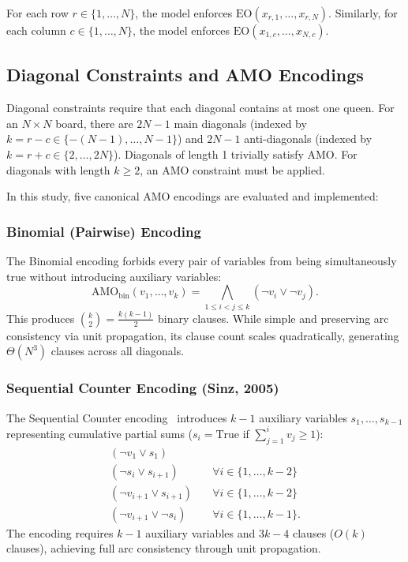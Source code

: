 \documentclass[a4paper,fleqn]{cas-sc}
\begin{document}
For each row $r \in \{1, \dots, N\}$, the model enforces $\text{EO}(x_{r,1}, \dots, x_{r,N})$. Similarly, for each column $c \in \{1, \dots, N\}$, the model enforces $\text{EO}(x_{1,c}, \dots, x_{N,c})$.

\subsection{Diagonal Constraints and AMO Encodings}
\label{sec:amo_methods}

Diagonal constraints require that each diagonal contains at most one queen. For an $N \times N$ board, there are $2N - 1$ main diagonals (indexed by $k = r - c \in \{-(N-1), \dots, N-1\}$) and $2N - 1$ anti-diagonals (indexed by $k = r + c \in \{2, \dots, 2N\}$). Diagonals of length 1 trivially satisfy AMO. For diagonals with length $k \ge 2$, an AMO constraint must be applied.

In this study, five canonical AMO encodings are evaluated and implemented:

\subsubsection{Binomial (Pairwise) Encoding}
The Binomial encoding forbids every pair of variables from being simultaneously true without introducing auxiliary variables:
\begin{equation}
    \text{AMO}_{\text{bin}}(v_1, \ldots, v_k) = \bigwedge_{1 \le i < j \le k} (\neg v_i \vee \neg v_j).
    \label{eq:amo_bin}
\end{equation}
This produces $\binom{k}{2} = \frac{k(k-1)}{2}$ binary clauses. While simple and preserving arc consistency via unit propagation, its clause count scales quadratically, generating $\Theta(N^3)$ clauses across all diagonals.

\subsubsection{Sequential Counter Encoding (Sinz, 2005)}
The Sequential Counter encoding~\cite{sinz2005towards} introduces $k-1$ auxiliary variables $s_1, \ldots, s_{k-1}$ representing cumulative partial sums ($s_i = \text{True}$ if $\sum_{j=1}^i v_j \ge 1$):
\begin{align}
    (\neg v_1 \vee s_1) & \label{eq:seq_1} \\
    (\neg s_i \vee s_{i+1}) & \quad \forall i \in \{1, \ldots, k-2\} \label{eq:seq_2} \\
    (\neg v_{i+1} \vee s_{i+1}) & \quad \forall i \in \{1, \ldots, k-2\} \label{eq:seq_3} \\
    (\neg v_{i+1} \vee \neg s_i) & \quad \forall i \in \{1, \ldots, k-1\}. \label{eq:seq_4}
\end{align}
The encoding requires $k-1$ auxiliary variables and $3k - 4$ clauses ($O(k)$ clauses), achieving full arc consistency through unit propagation.
\end{document}
